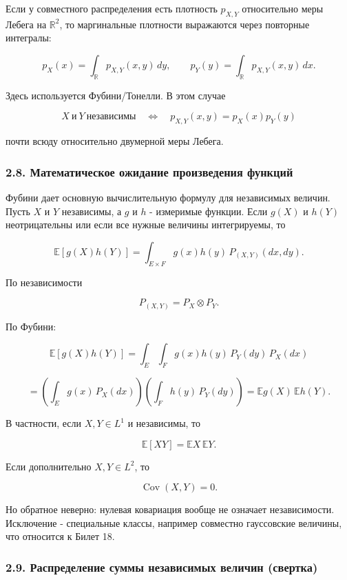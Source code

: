 \documentclass[
  11pt,
  a4paper,
]{article}
\begin{document}
Если у совместного распределения есть плотность \(p_{X,Y}\) относительно
меры Лебега на \(\mathbb R^2\), то маргинальные плотности выражаются
через повторные интегралы:

\[
p_X(x)=\int_{\mathbb R}p_{X,Y}(x,y)\,dy,
\qquad
p_Y(y)=\int_{\mathbb R}p_{X,Y}(x,y)\,dx.
\]

Здесь используется Фубини/Тонелли. В этом случае

\[
X\ \text{и}\ Y\ \text{независимы}
\quad\Longleftrightarrow\quad
p_{X,Y}(x,y)=p_X(x)p_Y(y)
\]

почти всюду относительно двумерной меры Лебега.

\subsubsection{2.8. Математическое ожидание произведения
функций}\label{ux43cux430ux442ux435ux43cux430ux442ux438ux447ux435ux441ux43aux43eux435-ux43eux436ux438ux434ux430ux43dux438ux435-ux43fux440ux43eux438ux437ux432ux435ux434ux435ux43dux438ux44f-ux444ux443ux43dux43aux446ux438ux439}

Фубини дает основную вычислительную формулу для независимых величин.
Пусть \(X\) и \(Y\) независимы, а \(g\) и \(h\) - измеримые функции.
Если \(g(X)\) и \(h(Y)\) неотрицательны или если все нужные величины
интегрируемы, то

\[
\mathbb E[g(X)h(Y)]
=
\int_{E\times F} g(x)h(y)\,P_{(X,Y)}(dx,dy).
\]

По независимости

\[
P_{(X,Y)}=P_X\otimes P_Y.
\]

По Фубини:

\[
\mathbb E[g(X)h(Y)]
=
\int_E\int_F g(x)h(y)\,P_Y(dy)\,P_X(dx)
\]

\[
=
\left(\int_E g(x)\,P_X(dx)\right)
\left(\int_F h(y)\,P_Y(dy)\right)
=
\mathbb E g(X)\,\mathbb E h(Y).
\]

В частности, если \(X,Y\in L^1\) и независимы, то

\[
\mathbb E[XY]=\mathbb EX\,\mathbb EY.
\]

Если дополнительно \(X,Y\in L^2\), то

\[
\operatorname{Cov}(X,Y)=0.
\]

Но обратное неверно: нулевая ковариация вообще не означает
независимости. Исключение - специальные классы, например совместно
гауссовские величины, что относится к Билет 18.

\subsubsection{2.9. Распределение суммы независимых величин
(свертка)}\label{ux440ux430ux441ux43fux440ux435ux434ux435ux43bux435ux43dux438ux435-ux441ux443ux43cux43cux44b-ux43dux435ux437ux430ux432ux438ux441ux438ux43cux44bux445-ux432ux435ux43bux438ux447ux438ux43d-ux441ux432ux435ux440ux442ux43aux430}
\end{document}
